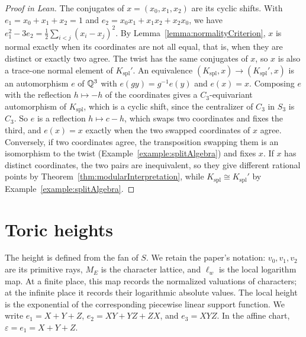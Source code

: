 \begin{proof}[Proof in Lean]

\leanok


The conjugates of $x=(x_0,x_1,x_2)$ are its cyclic shifts. With $e_1=x_0+x_1+x_2=1$ and $e_2=x_0x_1+x_1x_2+x_2x_0$, we have $e_1^2-3e_2=\frac12\sum_{i<j}(x_i-x_j)^2$. By Lemma~\ref{lemma:normalityCriterion}, $x$ is normal exactly when its coordinates are not all equal, that is, when they are distinct or exactly two agree. The twist has the same conjugates of $x$, so $x$ is also a trace-one normal element of $K_{\text{spl}}'$. An equivalence $(K_{\text{spl}},x)\to(K_{\text{spl}}',x)$ is an automorphism $e$ of $\mathbb{Q}^3$ with $e(gy)=g^{-1}e(y)$ and $e(x)=x$. Composing $e$ with the reflection $h\mapsto-h$ of the coordinates gives a $C_3$-equivariant automorphism of $K_{\text{spl}}$, which is a cyclic shift, since the centralizer of $C_3$ in $S_3$ is $C_3$. So $e$ is a reflection $h\mapsto c-h$, which swaps two coordinates and fixes the third, and $e(x)=x$ exactly when the two swapped coordinates of $x$ agree. Conversely, if two coordinates agree, the transposition swapping them is an isomorphism to the twist (Example~\ref{example:splitAlgebra}) and fixes $x$. If $x$ has distinct coordinates, the two pairs are inequivalent, so they give different rational points by Theorem~\ref{thm:modularInterpretation}, while $K_{\text{spl}}\cong K_{\text{spl}}'$ by Example~\ref{example:splitAlgebra}.

\end{proof}

\chapter{Toric heights}

The height is defined from the fan of $S$. We retain the paper's notation: $v_0,v_1,v_2$ are its primitive rays, $M_E$ is the character lattice, and $\ell_w$ is the local logarithm map. At a finite place, this map records the normalized valuations of characters; at the infinite place it records their logarithmic absolute values. The local height is the exponential of the corresponding piecewise linear support function. We write $e_1=X+Y+Z$, $e_2=XY+YZ+ZX$, and $e_3=XYZ$. In the affine chart, $\varepsilon=e_1=X+Y+Z$.

